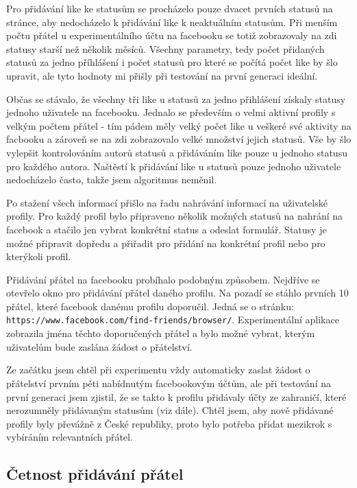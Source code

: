 \documentclass[thesis=M,czech]{FITthesis}[2013/05/10]
\begin{document}
Pro přidávání like ke statusům se procházelo pouze dvacet prvních statusů na stránce, aby nedocházelo k přidávání like k neaktuálním statusům. Při menším počtu přátel u experimentálního účtu na facebooku se totiž zobrazovaly na zdi statusy starší než několik měsíců. Všechny parametry, tedy počet přidaných statusů za jedno příhlášení i počet statusů pro které se počítá počet like by šlo upravit, ale tyto hodnoty mi přišly při testování na první generaci ideální.

Občas se stávalo, že všechny tři like u statusů za jedno přihlášení získaly statusy jednoho uživatele na facebooku. Jednalo se především o velmi aktivní profily s velkým počtem přátel - tím pádem měly velký počet like u veškeré své aktivity na facbooku a zároveň se na zdi zobrazovalo velké množství jejich statusů. Vše by šlo vylepšit kontrolováním autorů statusů a přidáváním like pouze u jednoho statusu pro každého autora. Naštěstí k přidávání like u statusů pouze jednoho uživatele nedocházelo často, takže jsem algoritmus neměnil.

Po stažení všech informací přišlo na řadu nahrávání informací na uživatelské profily. Pro každý profil bylo připraveno několik možných statusů na nahrání na facebook a stačilo jen vybrat konkrétní status a odeslat formulář. Statusy je možné připravit dopředu a přiřadit pro přidání na konkrétní profil nebo pro kterýkoli profil.

Přidávání přátel na facebooku probíhalo podobným způsobem. Nejdříve se otevřelo okno pro přidávání přátel daného profilu. Na pozadí se stáhlo prvních 10 přátel, které facebook danému profilu doporučil. Jedná se o stránku: \verb|https://www.facebook.com/find-friends/browser/|. Experimentální aplikace zobrazila jména těchto doporučených přátel a bylo možné vybrat, kterým uživatelům bude zaslána žádost o přátelství. 

Ze začátku jsem chtěl při experimentu vždy automaticky zaslat žádost o přátelství prvním pěti nabídnutým facebookovým účtům, ale při testování na první generaci jsem zjistil, že se takto k profilu přidávaly účty ze zahraničí, které nerozumněly přidávaným statusům (viz dále). Chtěl jsem, aby nově přidávané profily byly převážně z České republiky, proto bylo potřeba přidat mezikrok s vybíráním relevantních přátel.

\subsection{Četnost přidávání přátel}
\end{document}
